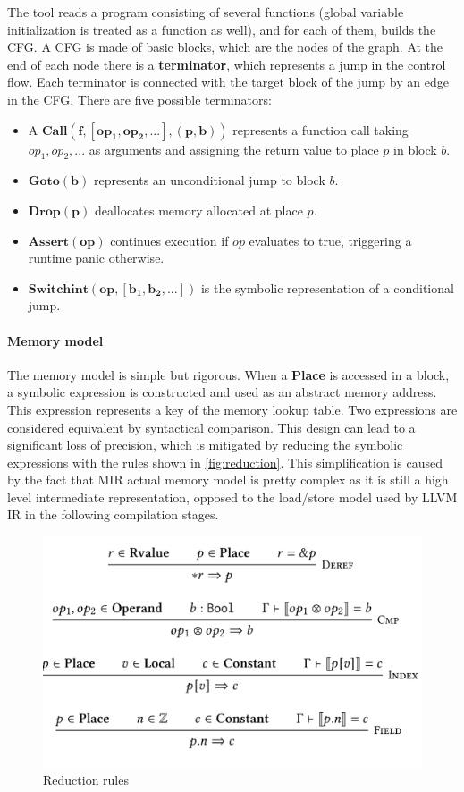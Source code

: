 \documentclass{article}
\begin{document}
The tool reads a program consisting of several functions (global variable initialization is treated as a function as well), and for each of them, builds the 
CFG. A CFG is made of basic blocks, which are the nodes of the graph. At the end of each node there is a \textbf{terminator}, which represents a jump  in the control flow. 
Each terminator is connected with the target block of the jump by an edge in the CFG. There  are five possible terminators:
\begin{itemize}
    \item A $\mathbf{Call(f , [op_1, op_2,...], (p, b))}$ represents a function call taking 
    $op_1,op_2,...$ as arguments and assigning the return value to place $p$ in block $b$.
    \item $\mathbf{Goto(b)}$ represents an unconditional jump to block $b$.
    \item $\mathbf{Drop(p)}$ deallocates  memory  allocated at place $p$.
    \item $\mathbf{Assert(op)}$ continues execution if $op$ evaluates to true, triggering a runtime panic otherwise.
    \item $\mathbf{Switchint(op,[ b_1, b_2, ...])}$ is the symbolic representation of a conditional jump.
    

\end{itemize}
\paragraph{Memory model} The memory model is simple but rigorous. When a \textbf{Place} is accessed 
in a block, a symbolic expression is constructed and used as an abstract memory address. This expression represents a key of the memory lookup 
table. Two expressions are considered equivalent by syntactical comparison. This design can lead 
to a significant loss of precision, which is mitigated by reducing the symbolic expressions with the 
rules shown in \autoref{fig:reduction}. This simplification is caused by the fact that MIR actual memory model is pretty complex as it is still 
a high level intermediate representation, opposed to the load/store model used by LLVM IR in the following compilation stages.

\begin{figure}[H]
    \includegraphics[scale=0.3]{red.png}
    \caption{Reduction rules}
    \label{fig:reduction}
\end{figure}
\end{document}
